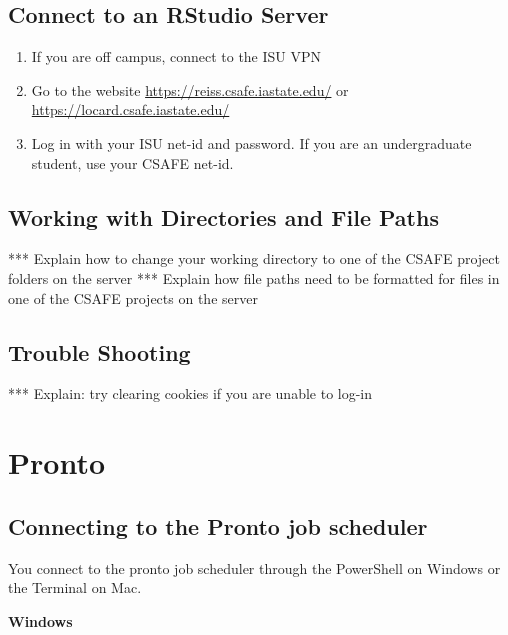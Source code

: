 \documentclass[
]{book}
\providecommand{\tightlist}{%
  \setlength{\itemsep}{0pt}\setlength{\parskip}{0pt}}
\begin{document}
\hypertarget{connect-to-an-rstudio-server}{%
\section{Connect to an RStudio Server}\label{connect-to-an-rstudio-server}}

\begin{enumerate}
\def\labelenumi{\arabic{enumi}.}
\tightlist
\item
  If you are off campus, connect to the ISU VPN
\item
  Go to the website \url{https://reiss.csafe.iastate.edu/} or \url{https://locard.csafe.iastate.edu/}
\item
  Log in with your ISU net-id and password. If you are an undergraduate student, use your CSAFE net-id.
\end{enumerate}

\hypertarget{working-with-directories-and-file-paths}{%
\section{Working with Directories and File Paths}\label{working-with-directories-and-file-paths}}

*** Explain how to change your working directory to one of the CSAFE project folders on the server
*** Explain how file paths need to be formatted for files in one of the CSAFE projects on the server

\hypertarget{trouble-shooting}{%
\section{Trouble Shooting}\label{trouble-shooting}}

*** Explain: try clearing cookies if you are unable to log-in

\hypertarget{pronto}{%
\chapter{Pronto}\label{pronto}}

\hypertarget{pronto}{%
\section{Connecting to the Pronto job scheduler}\label{pronto}}

You connect to the pronto job scheduler through the PowerShell on Windows or the Terminal on Mac.

\textbf{Windows}
\end{document}
